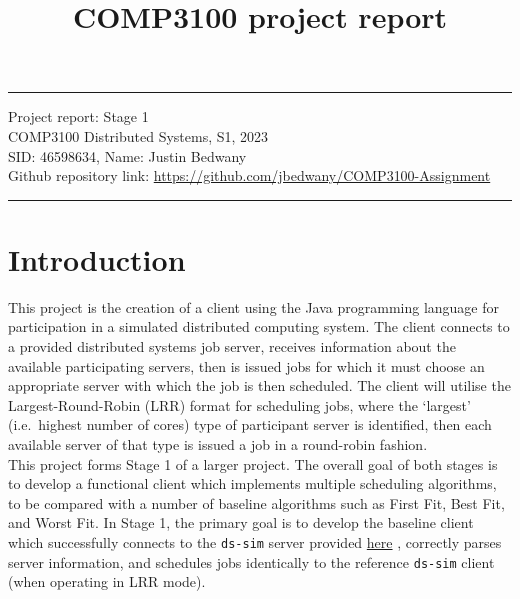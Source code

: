 \documentclass[a4paper]{article} %
\begin{document}

\title{COMP3100 project report} %
\fancyhead[C]{}
\hrule \medskip %
\begin{minipage}{1\textwidth} %
\centering 
\large %
Project report: Stage 1\\ %
COMP3100 Distributed Systems, S1, 2023\\
\normalsize %
SID\@: 46598634, Name: Justin Bedwany\\
Github repository link: \url{https://github.com/jbedwany/COMP3100-Assignment}
\end{minipage}
\medskip\hrule %
\bigskip

\section{Introduction} %
This project is the creation of a client using the Java programming language for participation in a simulated distributed computing system. The client connects to a provided distributed systems job server, receives 
information about the available participating servers, then is issued jobs for which it must choose an appropriate server with which the job is then scheduled. The client will utilise the Largest-Round-Robin (LRR) format 
for scheduling jobs, where the `largest' (i.e.\ highest number of cores) type of participant server is identified, then each available server of that type is issued a job in a round-robin fashion.\\

This project forms Stage 1 of a larger project. The overall goal of both stages is to develop a functional client which implements multiple scheduling algorithms, to be compared with a number of baseline algorithms 
such as First Fit,  Best Fit, and Worst Fit. In Stage 1, the primary goal is to develop the baseline client which successfully connects to the \texttt{ds-sim} server provided 
\href{https://github.com/distsys-MQ/ds-sim}{here} \cite{github}, correctly parses server information, and schedules jobs identically to the reference \texttt{ds-sim} client (when operating in LRR mode). 
\end{document}
